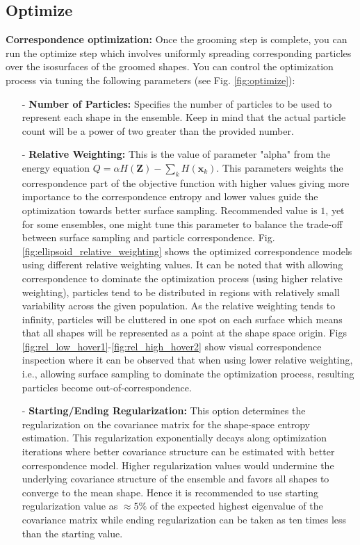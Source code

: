 \documentclass[letterpaper,12pt]{article}   %
\begin{document}
\subsection{Optimize}

\noindent\textbf{Correspondence optimization:} Once the grooming step is complete, you can run the optimize step which involves uniformly spreading corresponding particles over the isosurfaces of the groomed shapes. You can control the optimization process via tuning the following parameters (see Fig. \ref{fig:optimize}):

\begin{itemize}
	\item[-] \textbf{Number of Particles:} Specifies the number of particles to be used to represent each shape in the ensemble. Keep in mind that the actual particle count will be a power of two greater than the provided number.

	\item[-] \textbf{Relative Weighting:} This is the value of parameter "alpha" from the energy equation $Q =  \alpha H(\mathbf{Z}) -  \sum_k H(\mathbf{x}_k)$. This parameters weights the correspondence part of the objective function with higher values giving more importance to the correspondence entropy and lower values guide the optimization towards better surface sampling. Recommended value is $1$, yet for some ensembles, one might tune this parameter to balance the trade-off between surface sampling and particle correspondence. Fig. \ref{fig:ellipsoid_relative_weighting} shows the optimized correspondence models using different relative weighting values. It can be noted that with allowing correspondence to dominate the optimization process (using higher relative weighting), particles tend to be distributed in regions with relatively small variability across the given population. As the relative weighting tends to infinity, particles will be cluttered in one spot on each surface which means that all shapes will be represented as a point at the shape space origin. Figs \ref{fig:rel_low_hover1}-\ref{fig:rel_high_hover2} show visual correspondence inspection where it can be observed that when using lower relative weighting, i.e., allowing surface sampling to dominate the optimization process, resulting particles become out-of-correspondence.

\item[-] \textbf{Starting/Ending Regularization:}  This option determines the regularization on the covariance matrix for the shape-space entropy estimation. This regularization exponentially decays along optimization iterations where better covariance structure can be estimated with better correspondence model. Higher regularization values would undermine the underlying covariance structure of the ensemble and favors all shapes to converge to the mean shape. Hence it is recommended to use starting regularization value as $\approx 5\%$ of the expected highest eigenvalue of the covariance matrix while ending regularization can be taken as ten times less than the starting value. 


\end{itemize}
\end{document}
